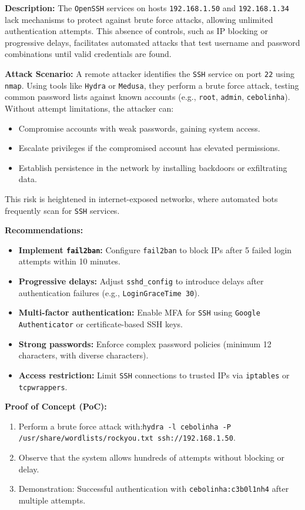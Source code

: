 \documentclass[a4paper,12pt]{article}
\begin{document}
\textbf{Description:}  
The \texttt{OpenSSH} services on hosts \texttt{192.168.1.50} and \texttt{192.168.1.34} lack mechanisms to protect against brute force attacks, allowing unlimited authentication attempts. This absence of controls, such as IP blocking or progressive delays, facilitates automated attacks that test username and password combinations until valid credentials are found.

\textbf{Attack Scenario:}  
A remote attacker identifies the \texttt{SSH} service on port \texttt{22} using \texttt{nmap}. Using tools like \texttt{Hydra} or \texttt{Medusa}, they perform a brute force attack, testing common password lists against known accounts (e.g., \texttt{root}, \texttt{admin}, \texttt{cebolinha}). Without attempt limitations, the attacker can:  
\begin{itemize}
    \item Compromise accounts with weak passwords, gaining system access.  
    \item Escalate privileges if the compromised account has elevated permissions.  
    \item Establish persistence in the network by installing backdoors or exfiltrating data.  
\end{itemize}
This risk is heightened in internet-exposed networks, where automated bots frequently scan for \texttt{SSH} services.

\textbf{Recommendations:}  
\begin{itemize}
    \item \textbf{Implement \texttt{fail2ban}:} Configure \texttt{fail2ban} to block IPs after 5 failed login attempts within 10 minutes.  
    \item \textbf{Progressive delays:} Adjust \texttt{sshd\_config} to introduce delays after authentication failures (e.g., \texttt{LoginGraceTime 30}).  
    \item \textbf{Multi-factor authentication:} Enable MFA for \texttt{SSH} using \texttt{Google Authenticator} or certificate-based SSH keys.  
    \item \textbf{Strong passwords:} Enforce complex password policies (minimum 12 characters, with diverse characters).  
    \item \textbf{Access restriction:} Limit \texttt{SSH} connections to trusted IPs via \texttt{iptables} or \texttt{tcpwrappers}.  
\end{itemize}

\textbf{Proof of Concept (PoC):}  
\begin{enumerate}
    \item Perform a brute force attack with:\newline \texttt{hydra -l cebolinha -P /usr/share/wordlists/rockyou.txt ssh://192.168.1.50}.  
    \item Observe that the system allows hundreds of attempts without blocking or delay.  
    \item Demonstration: Successful authentication with \texttt{cebolinha:c3b0l1nh4} after multiple attempts.  
\end{enumerate}
\end{document}
